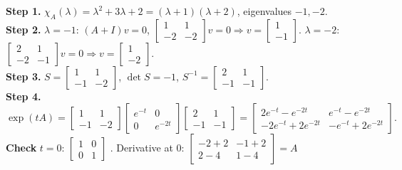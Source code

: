 \begin{workbox}[title={Worked example: $A=\begin{bmatrix}0&1\\-2&-3\end{bmatrix}$ (distinct eigenvalues)}]
\textbf{Step 1.} $\chi_A(\lambda)=\lambda^2+3\lambda+2=(\lambda+1)(\lambda+2)$, eigenvalues $-1,-2$.\\
\textbf{Step 2.} $\lambda=-1$: $(A+I)v=0$, $\begin{bmatrix}1&1\\-2&-2\end{bmatrix}v=0\Rightarrow v=\begin{bmatrix}1\\-1\end{bmatrix}$.
$\lambda=-2$: $\begin{bmatrix}2&1\\-2&-1\end{bmatrix}v=0\Rightarrow v=\begin{bmatrix}1\\-2\end{bmatrix}$.\\
\textbf{Step 3.} $S=\begin{bmatrix}1&1\\-1&-2\end{bmatrix}$, $\det S=-1$, $S^{-1}=\begin{bmatrix}2&1\\-1&-1\end{bmatrix}$.\\
\textbf{Step 4.}
\[\exp(tA)=\begin{bmatrix}1&1\\-1&-2\end{bmatrix}\begin{bmatrix}e^{-t}&0\\0&e^{-2t}\end{bmatrix}\begin{bmatrix}2&1\\-1&-1\end{bmatrix}
=\begin{bmatrix}2e^{-t}-e^{-2t}&e^{-t}-e^{-2t}\\-2e^{-t}+2e^{-2t}&-e^{-t}+2e^{-2t}\end{bmatrix}.\]
\textbf{Check} $t=0$: $\begin{bmatrix}1&0\\0&1\end{bmatrix}$ \checkmark. Derivative at $0$: $\begin{bmatrix}-2+2&-1+2\\2-4&1-4\end{bmatrix}=A$ \checkmark
\end{workbox}

